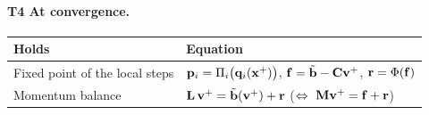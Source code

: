\paragraph{T4 At convergence.}\mbox{}
\begin{center}
\renewcommand{\arraystretch}{1.6}
\begin{tabular}{ll}
\textbf{Holds} & \textbf{Equation} \\ \hline
Fixed point of the local steps & $\mathbf{p}_i = \Pi_i\big(\mathbf{q}_i(\mathbf{x}^+)\big)$, \quad $\mathbf{f} = \tilde{\mathbf{b}} - \mathbf{C}\mathbf{v}^+$, \quad $\mathbf{r} = \Phi(\mathbf{f})$ \\
Momentum balance & $\mathbf{L}\,\mathbf{v}^+ = \tilde{\mathbf{b}}(\mathbf{v}^+) + \mathbf{r}$ \quad ($\Leftrightarrow\ \mathbf{M}\mathbf{v}^+ = \mathbf{f} + \mathbf{r}$) \\
\end{tabular}
\end{center}

